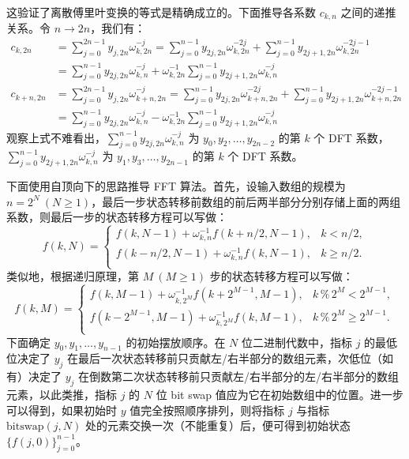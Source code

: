 \documentclass{ctexart}
\begin{document}
这验证了离散傅里叶变换的等式是精确成立的。下面推导各系数 $c_{k,n}$ 之间的递推关系。令 $n \to 2n$，我们有：
\begin{equation}
  \begin{split}
    c_{k,2n}
    &=
    \sum_{j = 0}^{2n - 1}y_{j,2n}\omega_{k,2n}^{-j}
    =
    \sum_{j = 0}^{n - 1}y_{2j,2n}\omega_{k,2n}^{-2j}
    +
    \sum_{j = 0}^{n - 1}y_{2j + 1,2n}\omega_{k,2n}^{-2j - 1}
    \\&=
    \sum_{j = 0}^{n - 1}y_{2j,2n}\omega_{k,n}^{-j}
    +
    \omega_{k,2n}^{-1}\sum_{j = 0}^{n - 1}y_{2j + 1,2n}\omega_{k,n}^{-j}
    \\c_{k + n,2n}
    &=
    \sum_{j = 0}^{2n - 1}y_{j,2n}\omega_{k + n,2n}^{-j}
    =
    \sum_{j = 0}^{n - 1}y_{2j,2n}\omega_{k + n,2n}^{-2j}
    +
    \sum_{j = 0}^{n - 1}y_{2j + 1,2n}\omega_{k + n,2n}^{-2j - 1}
    \\&=
    \sum_{j = 0}^{n - 1}y_{2j,2n}\omega_{k,n}^{-j}
    -
    \omega_{k,2n}^{-1}\sum_{j = 0}^{n - 1}y_{2j + 1,2n}\omega_{k,n}^{-j}
  \end{split}
\end{equation}
观察上式不难看出，$\sum_{j = 0}^{n - 1}y_{2j,2n}\omega_{k,n}^{-j}$ 为 $y_0, y_2, \dots, y_{2n - 2}$ 的第 $k$ 个 DFT 系数，$\sum_{j = 0}^{n - 1}y_{2j + 1,2n}\omega_{k,n}^{-j}$ 为 $y_1, y_3, \dots, y_{2n - 1}$ 的第 $k$ 个 DFT 系数。

下面使用自顶向下的思路推导 FFT 算法。首先，设输入数组的规模为 $n = 2^{N}\ (N \geq 1)$，最后一步状态转移前数组的前后两半部分分别存储上面的两组系数，则最后一步的状态转移方程可以写做：
\begin{equation}
  f(k, N) = \begin{cases}
    f(k, N - 1) + \omega_{k,n}^{-1}f(k + n/2, N - 1), & k < n/2, \\
    f(k - n/2, N - 1) + \omega_{k,n}^{-1}f(k, N - 1), & k \geq n/2. \\
  \end{cases}
\end{equation}
类似地，根据递归原理，第 $M\ (M \geq 1)$ 步的状态转移方程可以写做：
\begin{equation}
  f(k, M) = \begin{cases}
    f(k, M - 1) + \omega_{k,2^M}^{-1}f(k + 2^{M-1}, M - 1), & k\,\%\,2^M < 2^{M-1}, \\
    f(k - 2^{M-1}, M - 1) + \omega_{k,2^M}^{-1}f(k, M - 1), & k\,\%\,2^M \geq 2^{M-1}. \\
  \end{cases}
\end{equation}
下面确定 $y_0, y_1, \dots, y_{n - 1}$ 的初始摆放顺序。在 $N$ 位二进制代数中，指标 $j$ 的最低位决定了 $y_j$ 在最后一次状态转移前只贡献左/右半部分的数组元素，次低位（如有）决定了 $y_j$ 在倒数第二次状态转移前只贡献左/右半部分的左/右半部分的数组元素，以此类推，指标 $j$ 的 $N$ 位 bit swap 值应为它在初始数组中的位置。进一步可以得到，如果初始时 $y$ 值完全按照顺序排列，则将指标 $j$ 与指标 $\mathrm{bitswap}(j, N)$ 处的元素交换一次（不能重复）后，便可得到初始状态 $\{f(j, 0)\}_{j = 0}^{n - 1}$。
\end{document}
